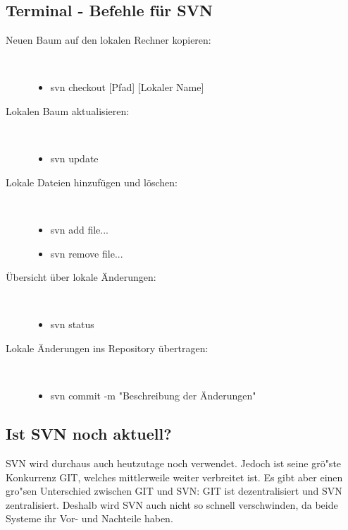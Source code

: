  \subsection{Terminal - Befehle f\"ur SVN}
 \begin{description}
\item[Neuen Baum auf den lokalen Rechner kopieren:]~\par
   \begin{itemize}
      \item svn checkout [Pfad] [Lokaler Name]
   \end{itemize}
\item[Lokalen Baum aktualisieren:]~\par
   \begin{itemize}
      \item svn update
   \end{itemize}
\item[Lokale Dateien hinzuf\"ugen und l\"oschen:]~\par
   \begin{itemize}
      \item svn add file...
      \item svn remove file...
   \end{itemize}
   \item[\"Ubersicht \"uber lokale \"Anderungen:]~\par
   \begin{itemize}
      \item svn status
   \end{itemize}
      \item[Lokale \"Anderungen ins Repository \"ubertragen:]~\par
   \begin{itemize}
      \item svn commit -m "Beschreibung der Änderungen"
   \end{itemize}
\end{description}

\subsection{Ist SVN noch aktuell?}
SVN wird durchaus auch heutzutage noch verwendet. Jedoch ist seine gr\"o"ste Konkurrenz GIT, welches mittlerweile weiter verbreitet ist. Es gibt aber einen gro"sen Unterschied zwischen GIT und SVN: GIT ist dezentralisiert und SVN zentralisiert. Deshalb wird SVN auch nicht so schnell verschwinden, da beide Systeme ihr Vor- und Nachteile haben.
